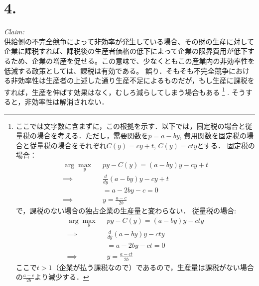 \documentclass[
]{ltjarticle}
\begin{document}
\hypertarget{section-3}{%
\section{4.}\label{section-3}}

\textit{Claim:}\\
供給側の不完全競争によって非効率が発生している場合、その財の生産に対して企業に課税すれば、課税後の生産者価格の低下によって企業の限界費用が低下するため、企業の増産を促せる。この意味で、少なくともこの産業内の非効率性を低減する政策としては、課税は有効である。
\newline \newline
誤り．そもそも不完全競争における非効率性は生産者の上述した通り生産不足によるものだが，もし生産に課税をすれば，生産を伸ばす効果はなく，むしろ減らしてしまう場合もある
\footnote{ここでは文字数に含まずに，この根拠を示す．以下では，固定税の場合と従量税の場合を考える．ただし，需要関数を$p = a - by$, 費用関数を固定税の場合と従量税の場合をそれぞれ$C(y) = cy + t$, $C(y) = cty$とする．\newline
固定税の場合：
$$\begin{aligned}
\arg\!\max_y \;\;&py - C(y)  = (a-by)y - cy + t \\
\implies& \frac{d}{dy} (a-by)y - cy + t \\
&= a - 2by - c = 0 \\
\implies& y = \frac{a - c}{2b}
\end{aligned}$$
で，課税のない場合の独占企業の生産量と変わらない． \newline
従量税の場合:
$$\begin{aligned}
\arg\!\max_y \;\;&py - C(y)  = (a-by)y - cty \\
\implies& \frac{d}{dy} (a-by)y - cty \\
&= a - 2by - ct = 0 \\
\implies& y = \frac{a - ct}{2b}
\end{aligned}$$
ここで$t > 1$（企業が払う課税なので）であるので，生産量は課税がない場合の$ \frac{a - c}{2b}$より減少する．}
. そうすると，非効率性は解消されない．
\end{document}

